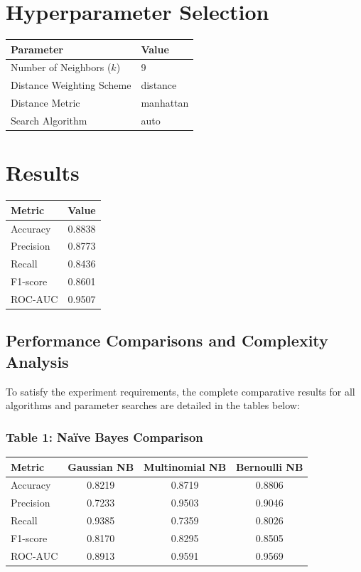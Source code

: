 \documentclass[12pt,a4paper]{article}
\begin{document}
\section{Hyperparameter Selection}
\begin{tabular}{ll}
\toprule
Parameter & Value\\
\midrule
Number of Neighbors ($k$) & 9 \\
Distance Weighting Scheme & distance \\
Distance Metric & manhattan \\
Search Algorithm & auto \\
\bottomrule
\end{tabular}

\section{Results}
\begin{tabular}{lc}
\toprule
Metric & Value\\
\midrule
Accuracy & 0.8838 \\
Precision & 0.8773 \\
Recall & 0.8436 \\
F1-score & 0.8601 \\
ROC-AUC & 0.9507 \\
\bottomrule
\end{tabular}

\subsection*{Performance Comparisons and Complexity Analysis}
To satisfy the experiment requirements, the complete comparative results for all algorithms and parameter searches are detailed in the tables below:

\subsubsection*{Table 1: Na\"ive Bayes Comparison}
\begin{tabular}{lccc}
\toprule
Metric & Gaussian NB & Multinomial NB & Bernoulli NB \\
\midrule
Accuracy & 0.8219 & 0.8719 & 0.8806 \\
Precision & 0.7233 & 0.9503 & 0.9046 \\
Recall & 0.9385 & 0.7359 & 0.8026 \\
F1-score & 0.8170 & 0.8295 & 0.8505 \\
ROC-AUC & 0.8913 & 0.9591 & 0.9569 \\
\bottomrule
\end{tabular}
\end{document}
